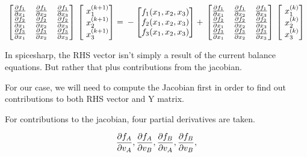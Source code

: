 \documentclass[12pt]{article}
\renewcommand{\_}{\kern-1.5pt\textunderscore\kern-1.5pt}
\begin{document}
$$ \begin{bmatrix}
\frac{\partial f_1}{\partial x_1}  & \frac{\partial f_1}{\partial x_2}  & \frac{\partial f_1}{\partial x_3} \\
\frac{\partial f_2}{\partial x_1}  & \frac{\partial f_2}{\partial x_2}  & \frac{\partial f_2}{\partial x_3} \\
\frac{\partial f_3}{\partial x_1}  & \frac{\partial f_3}{\partial x_2}  & \frac{\partial f_3}{\partial x_3} 
\end{bmatrix} \\ 
\begin{bmatrix}
\ x_1^{(k+1)}  \\
\ x_2^{(k+1)} \\
\ x_3^{(k+1)} 
\end{bmatrix} = \\
-\begin{bmatrix}
f_1 (x_1,x_2,x_3) \\
f_2 (x_1,x_2,x_3) \\
f_3 (x_1,x_2,x_3)
\end{bmatrix} + \\
\begin{bmatrix}
\frac{\partial f_1}{\partial x_1}  & \frac{\partial f_1}{\partial x_2}  & \frac{\partial f_1}{\partial x_3} \\
\frac{\partial f_2}{\partial x_1}  & \frac{\partial f_2}{\partial x_2}  & \frac{\partial f_2}{\partial x_3} \\
\frac{\partial f_3}{\partial x_1}  & \frac{\partial f_3}{\partial x_2}  & \frac{\partial f_3}{\partial x_3} 
\end{bmatrix} \\
\begin{bmatrix}
\ x_1^{(k)} \\
\ x_2^{(k)}\\
\ x_3^{(k)}
\end{bmatrix}
$$

In spicesharp, the RHS vector isn't simply a result of the current balance equations. But rather that plus contributions from the jacobian.

For our case, we will need to compute the Jacobian first in order to find out contributions to both RHS vector and Y matrix.

For contributions to the jacobian, four partial derivatives are taken. 

$$\frac{\partial f_A}{\partial v_A}, \frac{\partial f_A}{\partial v_B}, \\
\frac{\partial f_B}{\partial v_A}, \frac{\partial f_B}{\partial v_B}, $$
\end{document}
